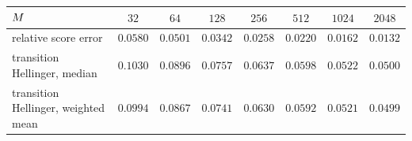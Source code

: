 
\begin{center}\small
\begin{tabular}{@{}lccccccc@{}}
\toprule
$M$ & $32$ & $64$ & $128$ & $256$ & $512$ & $1024$ & $2048$ \\
\midrule
relative score error & $0.0580$ & $0.0501$ & $0.0342$ & $0.0258$ & $0.0220$ & $0.0162$ & $0.0132$ \\
transition Hellinger, median & $0.1030$ & $0.0896$ & $0.0757$ & $0.0637$ & $0.0598$ & $0.0522$ & $0.0500$ \\
transition Hellinger, weighted mean & $0.0994$ & $0.0867$ & $0.0741$ & $0.0630$ & $0.0592$ & $0.0521$ & $0.0499$ \\
\bottomrule
\end{tabular}
\end{center}
